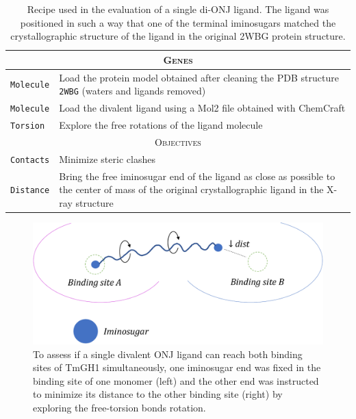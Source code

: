 \begin{table}[hbtp]
	\caption[Single di-ONJ recipe]{Recipe used in the evaluation of a single di-ONJ ligand. The ligand was positioned in such a way that one of the terminal iminosugars matched the crystallographic structure of the ligand in the original 2WBG protein structure.}
	\label{table:recipe-single-divalent}
	\footnotesize
	\newcommand{\tableheading}[1]{\multicolumn{2}{c}{\textsc{#1}}}
	\begin{tabularx}{\textwidth}{RL}
		\toprule
		\tableheading{Genes}\\
		\toprule
		\texttt{Molecule} & Load the protein model obtained after cleaning the PDB structure \texttt{2WBG} (waters and ligands removed) \\
		\midrule
		\texttt{Molecule} & Load the divalent ligand using a Mol2 file obtained with ChemCraft \\
		\midrule
		\texttt{Torsion} & Explore the free rotations of the ligand molecule \\
		\toprule
		\tableheading{Objectives}\\
		\toprule
		\texttt{Contacts} & Minimize steric clashes \\
		\midrule
		\texttt{Distance} & Bring the free iminosugar end of the ligand as close as possible to the center of mass of the original crystallographic ligand in the X-ray structure\cite{pdb:2wbg} \\

		\bottomrule

	\end{tabularx}
\end{table}


\begin{figure}[H] %
	\begin{Center}
		\includegraphics[width=\textwidth]{./figures/06/one-divalent-stretch-crop.pdf}
	\end{Center}
	\caption[Single di-ONJ inhibitor test]{To assess if a single divalent ONJ ligand can reach both binding sites of TmGH1 simultaneously, one iminosugar end was fixed in the binding site of one monomer (left) and the other end was instructed to minimize its distance to the other binding site (right) by exploring the free-torsion bonds rotation.}
	\label{fig:one-divalent-stretch}
\end{figure}



